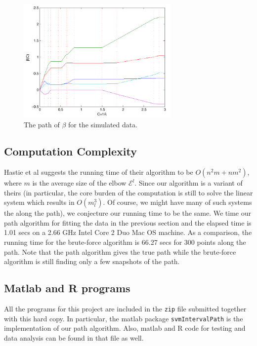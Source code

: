 \documentclass[10pt]{article}
\theoremstyle{definition}
\begin{document}
\begin{center}
\begin{figure}[!h]
   \centering
   \includegraphics[width=0.7\textwidth]{./betaPath.pdf} 
      \caption{The path of $\beta$ for the simulated data.}
   \label{fig:betaPath}
\end{figure}
\end{center}


\subsection{Computation Complexity}
Hastie et al \cite{hastie2004entire} suggests the running time of their algorithm to be $O(n^2m+nm^2)$, where $m$ is the average size of the elbow $\mathcal E^l$. Since our algorithm is a variant of theirs (in particular, the core burden of the computation is still to solve the linear system which results in $O(m_l^3)$. Of course, we might have many of such systems the along the path), we conjecture our running time to be the same. We time our path algorithm for fitting the data in the previous section and the elapsed time is 1.01 secs on a 2.66 GHz Intel Core 2 Duo Mac OS machine. As a comparison, the running time for the brute-force algorithm is 66.27 secs for 300 points along the path. Note that the path algorithm gives the true path while the brute-force algorithm is still finding only a few snapshots of the path.  

\subsection{Matlab and R programs}
All the programs for this project are included in the {\tt zip} file submitted together with this hard copy. In particular, the matlab package {\tt svmIntervalPath} is the implementation of our path algorithm. Also, matlab and R code for testing and data analysis can be found in that file as well.
\end{document}
